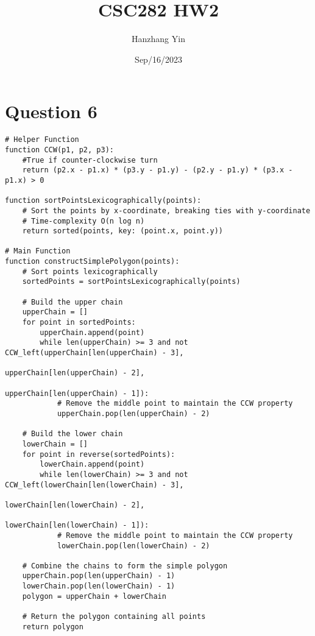 \documentclass{article}
\title{CSC282 HW2}
\author{Hanzhang Yin}
\date{Sep/16/2023}
\begin{document}
\maketitle

\section*{Question 6}

\begin{verbatim}
# Helper Function
function CCW(p1, p2, p3):
    #True if counter-clockwise turn
    return (p2.x - p1.x) * (p3.y - p1.y) - (p2.y - p1.y) * (p3.x - p1.x) > 0  

function sortPointsLexicographically(points):
    # Sort the points by x-coordinate, breaking ties with y-coordinate
    # Time-complexity O(n log n)
    return sorted(points, key: (point.x, point.y))

# Main Function
function constructSimplePolygon(points):
    # Sort points lexicographically
    sortedPoints = sortPointsLexicographically(points)

    # Build the upper chain
    upperChain = []
    for point in sortedPoints:
        upperChain.append(point)
        while len(upperChain) >= 3 and not CCW_left(upperChain[len(upperChain) - 3],
                                                    upperChain[len(upperChain) - 2],
                                                    upperChain[len(upperChain) - 1]):
            # Remove the middle point to maintain the CCW property
            upperChain.pop(len(upperChain) - 2)

    # Build the lower chain
    lowerChain = []
    for point in reverse(sortedPoints):
        lowerChain.append(point)
        while len(lowerChain) >= 3 and not CCW_left(lowerChain[len(lowerChain) - 3],
                                                    lowerChain[len(lowerChain) - 2],
                                                    lowerChain[len(lowerChain) - 1]):
            # Remove the middle point to maintain the CCW property
            lowerChain.pop(len(lowerChain) - 2)

    # Combine the chains to form the simple polygon
    upperChain.pop(len(upperChain) - 1)
    lowerChain.pop(len(lowerChain) - 1)
    polygon = upperChain + lowerChain

    # Return the polygon containing all points
    return polygon
\end{verbatim}

\newpage
\end{document}
